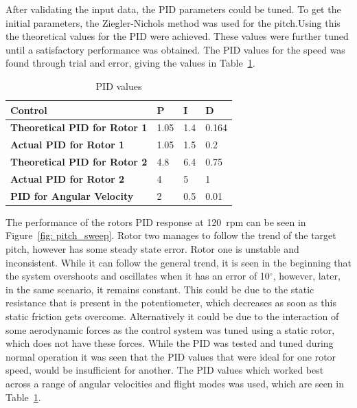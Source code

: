         After validating the input data, the PID parameters could be tuned. To get the initial parameters, the Ziegler-Nichols method was used for the pitch.Using this the theoretical values for the PID were achieved. These values were further tuned until a satisfactory performance was obtained. The PID values for the speed was found through trial and error, giving the values in Table~\ref{tab: PID_Values}.
        \begin{table}[h]
            \centering
            \caption{PID values}
            \label{tab: PID_Values}
            \begin{tabular}{|l|l|l|l|}
            \hline
            \rowcolor[HTML]{EFEFEF} 
            \textbf{Control}                     & \textbf{P} & \textbf{I} & \textbf{D} \\ \hline
            \textbf{Theoretical PID for Rotor 1} & 1.05       & 1.4        & 0.164      \\ \hline
            \textbf{Actual PID for Rotor 1}      & 1.05       & 1.5        & 0.2        \\ \hline
            \textbf{Theoretical PID for Rotor 2} & 4.8        & 6.4        & 0.75       \\ \hline
            \textbf{Actual PID for Rotor 2}      & 4          & 5          & 1          \\ \hline
            \textbf{PID for Angular Velocity}    & 2          & 0.5        & 0.01       \\ \hline
            \end{tabular}
            \end{table}
        The performance of the rotors PID response at 120~rpm can be seen in Figure~\ref{fig: pitch_sweep}. Rotor two manages to follow the trend of the target pitch, however has some  steady state error. Rotor one is unstable and inconsistent. While it can follow the general trend, it is seen in the beginning that the system overshoots and oscillates when it has an error of 10\(^\circ\), however, later, in the same scenario, it remains constant. This could be due to the static resistance that is present in the potentiometer, which decreases as soon as this static friction gets overcome. Alternatively it could be due to the interaction of some aerodynamic forces as the control system was tuned using a static rotor, which does not have these forces. While the PID was tested and tuned during normal operation it was seen that the PID values that were ideal for one rotor speed, would be insufficient for another. The PID values which worked best across a range of angular velocities and flight modes was used, which are seen in Table~\ref{tab: PID_Values}.
